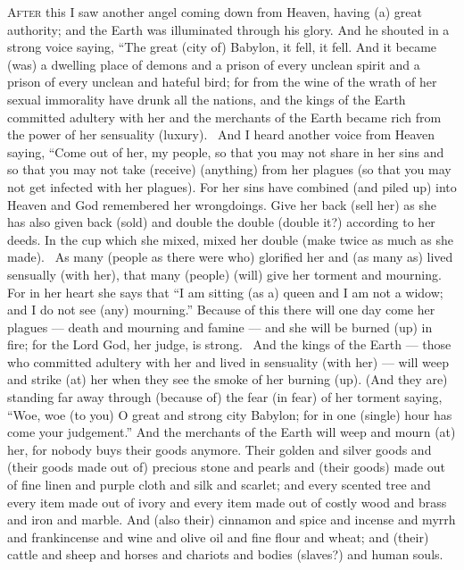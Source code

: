 \begin{pages}
\begin{Leftside}
		\renewcommand{\LettrineFontHook}{\Zallmanfamily}
		\lettrine[lines=3]{A}{fter} this I saw another angel coming down from Heaven, having (a) great authority; and the Earth was illuminated through his glory. And he shouted in a strong voice saying, “The great (city of) Babylon, it fell, it fell. And it became (was) a dwelling place of demons and a prison of every unclean spirit and a prison of every unclean and hateful bird; for from the wine of the wrath of her sexual immorality have drunk all the nations, and the kings of the Earth committed adultery with her and the merchants of the Earth became rich from the power of her sensuality (luxury). 
		\pend
		\pstart
		And I heard another voice from Heaven saying, “Come out of her, my people, so that you may not share in her sins and so that you may not take (receive) (anything) from her plagues (so that you may not get infected with her plagues). For her sins have combined (and piled up) into Heaven and God remembered her wrongdoings. Give her back (sell her) as she has also given back (sold) and double the double (double it?) according to her deeds. In the cup which she mixed, mixed her double (make twice as much as she made). 
		\pend
		\pstart
		As many (people as there were who) glorified her and (as many as) lived sensually (with her), that many (people) (will) give her torment and mourning. For in her heart she says that “I am sitting (as a) queen and I am not a widow; and I do not see (any) mourning.” Because of this there will one day come her plagues — death and mourning and famine — and she will be burned (up) in fire; for the Lord God, her judge, is strong. 
		\pend
		\pstart
		And the kings of the Earth — those who committed adultery with her and lived in sensuality (with her) — will weep and strike (at) her when they see the smoke of her burning (up). (And they are) standing far away through (because of) the fear (in fear) of her torment saying, “Woe, woe (to you) O great and strong city Babylon; for in one (single) hour has come your judgement.”
		\pend
		\pstart
		And the merchants of the Earth will weep and mourn (at) her, for nobody buys their goods anymore. Their golden and silver goods and (their goods made out of) precious stone and pearls and (their goods) made out of fine linen and purple cloth and silk and scarlet; and every scented tree and every item made out of ivory and every item made out of costly wood and brass and iron and marble. And (also their) cinnamon and spice and incense and myrrh and frankincense and wine and olive oil and fine flour and wheat; and (their) cattle and sheep and horses and chariots and bodies (slaves?) and human souls. 

\end{Leftside}
\end{pages}
